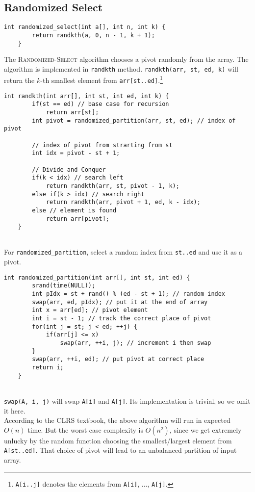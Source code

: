 \documentclass[12pt]{article}
\begin{document}
\subsection{Randomized Select}
\begin{lstlisting}[style=Cstyle]
	int randomized_select(int a[], int n, int k) {
		return randkth(a, 0, n - 1, k + 1);
	}
\end{lstlisting}
The \textsc{Randomized-Select} algorithm chooses a pivot randomly from the array. The algorithm is implemented in \texttt{randkth} method. \texttt{randkth(arr, st, ed, k)} will return the $k$-th smallest element from \texttt{arr[st..ed]}.\footnote{\texttt{A[i..j]} denotes the elements from \texttt{A[i]}, ..., \texttt{A[j]}.}
\begin{lstlisting}[style=Cstyle]
	int randkth(int arr[], int st, int ed, int k) {
		if(st == ed) // base case for recursion
			return arr[st];
		int pivot = randomized_partition(arr, st, ed); // index of pivot
		
		// index of pivot from strarting from st
		int idx = pivot - st + 1; 
		
		// Divide and Conquer
		if(k < idx) // search left
			return randkth(arr, st, pivot - 1, k);
		else if(k > idx) // search right
			return randkth(arr, pivot + 1, ed, k - idx);
		else // element is found
			return arr[pivot];
	}
\end{lstlisting}~\\
For \texttt{randomized\_partition}, select a random index from \texttt{st..ed} and use it as a pivot.
\begin{lstlisting}[style=Cstyle]
	int randomized_partition(int arr[], int st, int ed) {
		srand(time(NULL));
		int pIdx = st + rand() % (ed - st + 1); // random index
		swap(arr, ed, pIdx); // put it at the end of array
		int x = arr[ed]; // pivot element
		int i = st - 1; // track the correct place of pivot
		for(int j = st; j < ed; ++j) {
			if(arr[j] <= x)
				swap(arr, ++i, j); // increment i then swap
		}
		swap(arr, ++i, ed); // put pivot at correct place
		return i;
	}
\end{lstlisting}~\\
\texttt{swap(A, i, j)} will swap \texttt{A[i]} and \texttt{A[j]}. Its implementation is trivial, so we omit it here.\\
According to the CLRS textbook, the above algorithm will run in expected $O(n)$ time. But the worst case complexity is $O(n^2)$, since we get extremely unlucky by the random function choosing the smallest/largest element from \texttt{A[st..ed]}. That choice of pivot will lead to an unbalanced partition of input array.\\
\end{document}
